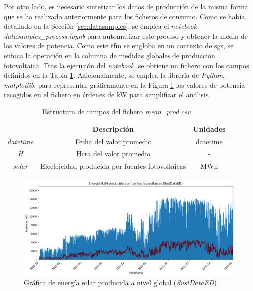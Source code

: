 \vspace{3mm}

Por otro lado, es necesario sintetizar los datos de producción de la misma forma que se ha realizado anteriormente para los ficheros de consumo. Como se había detallado en la Sección \ref{sec:datasamples}, se emplea el \textit{notebook} \textit{datasamples\_process.ipynb} para automatizar este proceso y obtener la media de los valores de potencia. Como este \gls{tfm} se engloba en un contexto de \gls{sg}s, se enfoca la operación en la columna de medidas globales de producción fotovoltaica. Tras la ejecución del \textit{notebook}, se obtiene un fichero con los campos definidos en la Tabla \ref{tab:prodsamples}. Adicionalmente, se emplea la librería de \textit{Python}, \textit{matplotlib}, para representar gráficamente en la Figura \ref{fig:solar} los valores de potencia recogidos en el fichero en órdenes de kW para simplificar el análisis.

\vspace{3mm}

\begin{table}[h!]
  \centering
  \begin{tabular}{|c|c|c|}
  \hline
  \rowcolor[HTML]{AAAAAA} 
  \multicolumn{1}{|c|}{\cellcolor[HTML]{AAAAAA}Campo} & \multicolumn{1}{c|}{\cellcolor[HTML]{AAAAAA}Descripción} & Unidades \\ \hline
  \textit{datetime} & Fecha del valor promedio & datetime \\ \hline
  \textit{H} & Hora del valor promedio & - \\ \hline
  \textit{solar} & Electricidad producida por fuentes fotovoltaicas & MWh \\ \hline
  \end{tabular}
  \caption{Estructura de campos del fichero \textit{mean\_prod.csv}}
  \label{tab:prodsamples}
\end{table}

\begin{figure}[h!]
  \centering
  \includegraphics[width=1\textwidth]{img/diseno/matplotsolar.png}
  \caption{Gráfica de energía solar producida a nivel global (\textit{SustDataED})}
  \label{fig:solar}
\end{figure}


